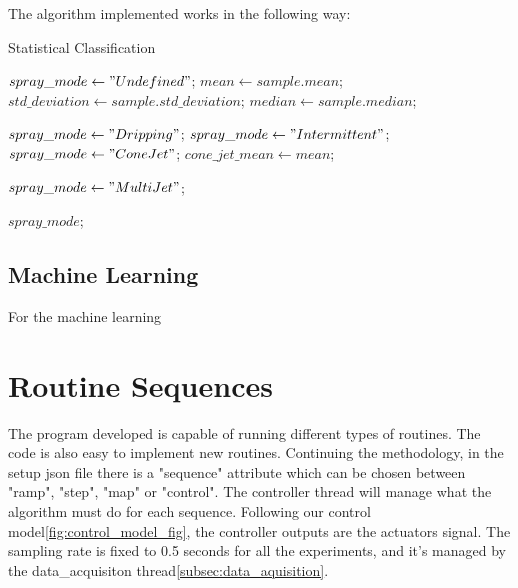 	The algorithm implemented works in the following way:
	\begin{algorithm}
        \caption{Statistical Classification}\label{alg:statistical_class}
        \begin{algorithmic}

            \State $spray\_mode \gets "Undefined"$;
            \State $mean \gets sample.mean$; 
            \State $std\_deviation \gets sample.std\_deviation$;
            \State $median \gets sample.median$;
            
                \State $spray\_mode \gets "Dripping"$;
                \State $spray\_ mode \gets "Intermittent"$;
                \State $spray\_ mode \gets "Cone Jet"$;
                \State $cone\_jet\_mean \gets mean$;
            \EndIf

            \EndIf

                    \State $spray\_ mode \gets "Multi Jet"$;
                \EndIf
            \EndIf

            \Return $spray\_ mode$;
        \EndFunction
        \end{algorithmic}
    \end{algorithm}


\subsection{Machine Learning}

For the machine learning 


\section{Routine Sequences}
\label{sec:routine_sequences}

    The program developed is capable of running different types of routines. The code is also easy to implement new routines.
    Continuing the methodology, in the setup json file there is a "sequence" attribute which can be chosen between "ramp", "step", "map" or "control".
    The controller thread will manage what the algorithm must do for each sequence.
    Following our control model\ref{fig:control_model_fig}, the controller outputs are the actuators signal.
    The sampling rate is fixed to 0.5 seconds for all the experiments, and it's managed by the data\_acquisiton thread\ref{subsec:data_aquisition}.


